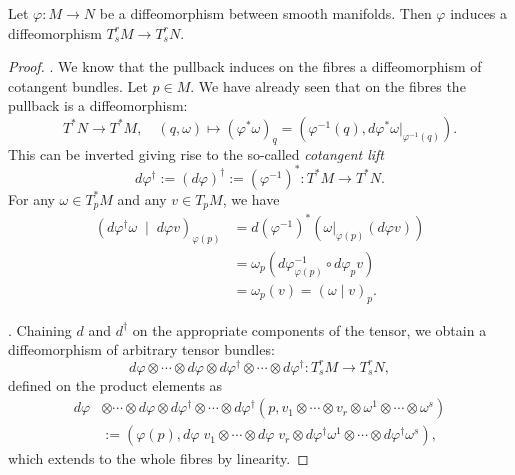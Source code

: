 \begin{proposition}
  Let $\varphi:M\to N$ be a diffeomorphism between smooth manifolds.
  Then $\varphi$ induces a diffeomorphism $T_s^rM \to T_s^r N$.
\end{proposition}
\begin{proof}
.
We know that the pullback induces on the fibres a diffeomorphism of cotangent bundles. Let $p\in M$.
We have already seen that on the fibres the pullback is a diffeomorphism:
\begin{equation}
  T^*N \to T^* M, \quad
  (q,\omega) \mapsto (\varphi^*\omega)_q = \left(\varphi^{-1}(q), d\varphi^*\omega|_{\varphi^{-1}(q)}\right).
\end{equation}
This can be inverted giving rise to the so-called \emph{cotangent lift}
\begin{equation}
  d\varphi^\dagger :=(d\varphi)^\dagger := (\varphi^{-1})^*: T^*M \to T^*N.
\end{equation}
For any $\omega\in T_p^* M$ and any $v\in T_pM$, we have
\begin{align}
  (d\varphi^\dagger \omega \;\mid\; d\varphi v)_{\varphi(p)} &=  d(\varphi^{-1})^*(\omega|_{\varphi(p)} (d\varphi v) )\\
  &= \omega_p(d\varphi^{-1}_{\varphi(p)} \circ d\varphi_p v ) \\
  &= \omega_p(v) = (\omega \mid v)_p.
\end{align}

.
Chaining $d$ and $d^\dagger$ on the appropriate components of the tensor, we obtain a diffeomorphism of arbitrary tensor bundles:
\begin{equation}
  d\varphi \otimes\cdots\otimes d\varphi \otimes d\varphi^\dagger \otimes\cdots\otimes d\varphi^\dagger  : T_s^rM \to T_s^r N,
\end{equation}
defined on the product elements as
\begin{align}
  d\varphi &\otimes\cdots\otimes d\varphi \otimes d\varphi^\dagger \otimes\cdots\otimes d\varphi^\dagger  (p, v_1 \otimes \cdots\otimes v_r \otimes \omega^1\otimes\cdots\otimes\omega^s) \\
  &:= (\varphi(p), d\varphi\; v_1 \otimes \cdots\otimes d\varphi\; v_r \otimes d\varphi^\dagger \omega^1\otimes\cdots\otimes d\varphi^\dagger \omega^s),
\end{align}
which extends to the whole fibres by linearity.
\end{proof}


